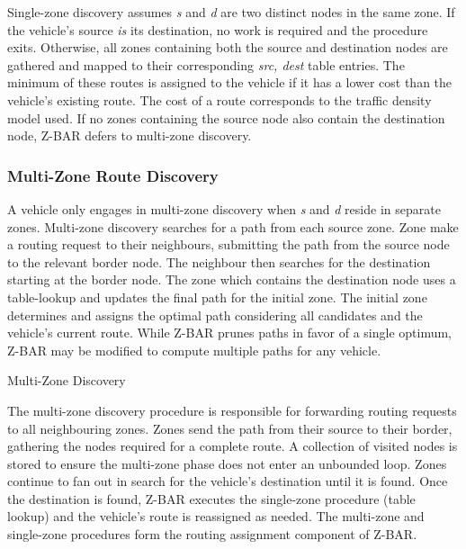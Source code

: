 \documentclass[conference]{IEEEtran}
\begin{document}
Single-zone discovery assumes \textit{s} and \textit{d} are two distinct nodes in the same zone. If the vehicle's source \textit{is} its destination, no work is required and the procedure exits. Otherwise, all zones containing both the source and destination nodes are gathered and mapped to their corresponding \textit{src, dest} table entries. The minimum of these routes is assigned to the vehicle if it has a lower cost than the vehicle's existing route. The cost of a route corresponds to the traffic density model used. If no zones containing the source node also contain the destination node, Z-BAR defers to multi-zone discovery.

\subsubsection{Multi-Zone Route Discovery}

A vehicle only engages in multi-zone discovery when \textit{s} and \textit{d} reside in separate zones. Multi-zone discovery searches for a path from each source zone. Zone make a routing request to their neighbours, submitting the path from the source node to the relevant border node. The neighbour then searches for the destination starting at the border node. The zone which contains the destination node uses a table-lookup and updates the final path for the initial zone. The initial zone determines and assigns the optimal path considering all candidates and the vehicle's current route. While Z-BAR prunes paths in favor of a single optimum, Z-BAR may be modified to compute multiple paths for any vehicle.

\begin{algorithm}[H]
  \caption{Multi-Zone Discovery}
  \label{route_discovery_multi_zone}
  \begin{algorithmic}[1]
      \EndIf
    \EndFor
  \EndFor
  \EndProcedure
  \end{algorithmic}
\end{algorithm}

The multi-zone discovery procedure is responsible for forwarding routing requests to all neighbouring zones. Zones send the path from their source to their border, gathering the nodes required for a complete route. A collection of visited nodes is stored to ensure the multi-zone phase does not enter an unbounded loop. Zones continue to fan out in search for the vehicle's destination until it is found. Once the destination is found, Z-BAR executes the single-zone procedure (table lookup) and the vehicle's route is reassigned as needed. The multi-zone and single-zone procedures form the routing assignment component of Z-BAR.
\end{document}

